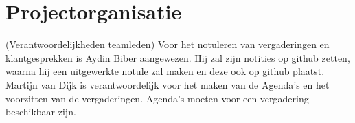 \chapter{Projectorganisatie}
(Verantwoordelijkheden teamleden)
Voor het notuleren van vergaderingen en klantgesprekken is Aydin Biber aangewezen. Hij zal zijn notities op github zetten, waarna hij een uitgewerkte notule zal maken en deze ook op github plaatst.
Martijn van Dijk is verantwoordelijk voor het maken van de Agenda's en het voorzitten van de vergaderingen. Agenda's moeten voor een vergadering beschikbaar zijn.